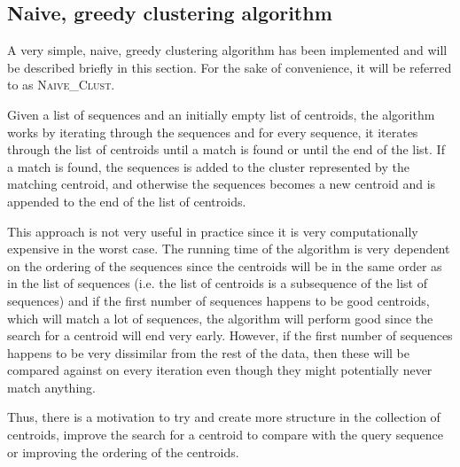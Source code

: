 \subsection{Naive, greedy clustering algorithm}

A very simple, naive, greedy clustering algorithm has been implemented and will
be described briefly in this section. For the sake of convenience, it will be
referred to as \textsc{Naive\_Clust}.

Given a list of sequences and an initially empty list of centroids, the
algorithm works by iterating through the sequences and for every sequence, it
iterates through the list of centroids until a match is found or until the end
of the list. If a match is found, the sequences is added to the cluster
represented by the matching centroid, and otherwise the sequences becomes a new
centroid and is appended to the end of the list of centroids.



This approach is not very useful in practice since it is very computationally
expensive in the worst case. The running time of the algorithm is very
dependent on the ordering of the sequences since the centroids will be in the
same order as in the list of sequences (i.e. the list of centroids is a
subsequence of the list of sequences) and if the first number of sequences
happens to be good centroids, which will match a lot of sequences, the
algorithm will perform good since the search for a centroid will end very
early. However, if the first number of sequences happens to be very dissimilar
from the rest of the data, then these will be compared against on every
iteration even though they might potentially never match anything.

Thus, there is a motivation to try and create more structure in the collection
of centroids, improve the search for a centroid to compare with the query
sequence or improving the ordering of the centroids.



